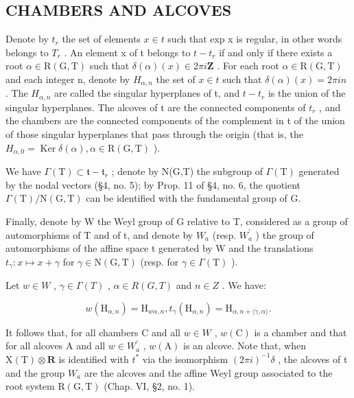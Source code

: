 \subsection{CHAMBERS AND ALCOVES}

Denote by \(t_{r}\) the set of elements \(x \in t\) such that exp x is regular, in other words belongs to \(T_{r}\) . An element x of t belongs to \(t - t_{r}\) if and only if there exists a root \(\alpha \in \mathrm{R}(\mathrm{G}, \mathrm{T})\) such that \(\delta(\alpha)(x) \in 2\pi i\mathbf{Z}\) . For each root \(\alpha \in \mathrm{R}(\mathrm{G}, \mathrm{T})\) and each integer n, denote by \(H_{\alpha,n}\) the set of \(x \in t\) such that \(\delta(\alpha)(x) = 2\pi in\) . The \(H_{\alpha,n}\) are called the singular hyperplanes of t, and \(t - t_{r}\) is the union of the singular hyperplanes. The alcoves of t are the connected components of \(t_{r}\) , and the chambers are the connected components of the complement in t of the union of those singular hyperplanes that pass through the origin (that is, the \(H_{\alpha,0} = \operatorname{Ker}\delta(\alpha), \alpha \in \mathrm{R}(\mathrm{G}, \mathrm{T})\) ).

We have \(\varGamma(\mathrm{T})\subset\mathfrak{t}-\mathfrak{t}_{r}\) ; denote by N(G,T) the subgroup of \(\varGamma(\mathrm{T})\) generated by the nodal vectors (§4, no. 5); by Prop. 11 of §4, no. 6, the quotient \(\varGamma(\mathrm{T})/\mathrm{N}(\mathrm{G},\mathrm{T})\) can be identified with the fundamental group of G.

Finally, denote by W the Weyl group of G relative to T, considered as a group of automorphisms of T and of t, and denote by \(W_{a}\) (resp. \(W_{a}^{\prime}\) ) the group of automorphisms of the affine space t generated by W and the translations \(t_{\gamma}: x \mapsto x + \gamma\) for \(\gamma \in \mathrm{N}(\mathrm{G}, \mathrm{T})\) (resp. for \(\gamma \in \Gamma(\mathrm{T})\) ).

Let \(w \in W\) , \(\gamma \in \Gamma(T)\) , \(\alpha \in R(G, T)\) and \(n \in Z\) . We have:

\[
w (\mathrm{H} _ {\alpha , n}) = \mathrm{H} _ {w \alpha , n}, t _ {\gamma} (\mathrm{H} _ {\alpha , n}) = \mathrm{H} _ {\alpha , n + \langle \gamma , \alpha \rangle}.
\]

It follows that, for all chambers C and all \(w \in W\) , \(w(\mathrm{C})\) is a chamber and that for all alcoves A and all \(w \in W_{a}^{\prime}\) , \(w(\mathrm{A})\) is an alcove. Note that, when \(\mathrm{X}(\mathrm{T}) \otimes \mathbf{R}\) is identified with \(t^{*}\) via the isomorphism \((2\pi i)^{-1}\delta\) , the alcoves of t and the group \(W_{a}\) are the alcoves and the affine Weyl group associated to the root system \(\mathrm{R}(\mathrm{G}, \mathrm{T})\) (Chap. VI, §2, no. 1).

